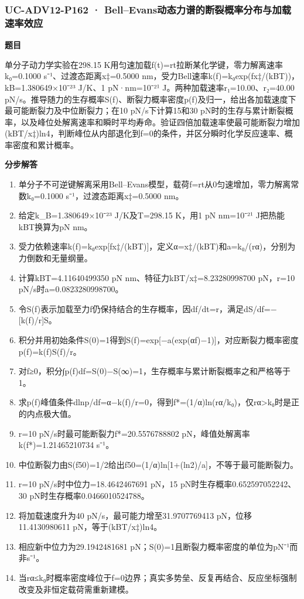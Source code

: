 \documentclass[UTF8,11pt,a4paper]{ctexart}
\begin{document}
\subsubsection*{UC-ADV12-P162 · Bell–Evans动态力谱的断裂概率分布与加载速率效应}
\noindent\textbf{题目}\par
单分子动力学实验在298.15 K用匀速加载f(t)=rt拉断某化学键，零力解离速率k₀=0.1000 s⁻¹、过渡态距离x‡=0.5000 nm，受力Bell速率k(f)=k₀exp(fx‡/(kBT))，kB=1.380649×10⁻²³ J/K、1 pN·nm=10⁻²¹ J。两种加载速率r₁=10.00、r₂=40.00 pN/s。推导随力的生存概率S(f)、断裂力概率密度p(f)及归一，给出各加载速度下最可能断裂力及中位断裂力；在10 pN/s下计算15和30 pN时的生存与累计断裂概率，以及峰位处解离速率和瞬时平均寿命。验证四倍加载速率使最可能断裂力增加(kBT/x‡)ln4，判断峰位从内部退化到f=0的条件，并区分瞬时化学反应速率、概率密度和累计概率。\par
\medskip\noindent\textbf{分步解答}
\begin{enumerate}
\item 单分子不可逆键解离采用Bell–Evans模型，载荷f=rt从0匀速增加，零力解离常数k₀=0.1000 s⁻¹，过渡态距离x‡=0.5000 nm。
\item 给定k\_B=1.380649×10⁻²³ J/K及T=298.15 K，用1 pN nm=10⁻²¹ J把热能kBT换算为pN nm。
\item 受力依赖速率k(f)=k₀exp[fx‡/(kBT)]，定义α=x‡/(kBT)和a=k₀/(rα)，分别为力倒数和无量纲量。
\item 计算kBT=4.11640499350 pN nm、特征力kBT/x‡=8.23280998700 pN，r=10 pN/s时a=0.0823280998700。
\item 令S(f)表示加载至力f仍保持结合的生存概率，因df/dt=r，满足dS/df=−[k(f)/r]S。
\item 积分并用初始条件S(0)=1得到S(f)=exp[−a(exp(αf)−1)]，对应断裂力概率密度p(f)=k(f)S(f)/r。
\item 对f≥0，积分∫p(f)df=S(0)−S(∞)=1，生存概率与累计断裂概率之和严格等于1。
\item 求p(f)峰值条件dlnp/df=α−k(f)/r=0，得到f*=(1/α)ln(rα/k₀)，仅rα>k₀时是正的内点极大值。
\item r=10 pN/s时最可能断裂力f*=20.5576788802 pN，峰值处解离率k(f*)=1.21465210734 s⁻¹。
\item 中位断裂力由S(f50)=1/2给出f50=(1/α)ln[1+(ln2)/a]，不等于最可能断裂力。
\item r=10 pN/s时中位力=18.4642467691 pN，15 pN时生存概率0.652597052242、30 pN时生存概率0.0466010524788。
\item 将加载速度升为40 pN/s，最可能力增至31.9707769413 pN，位移11.4130980611 pN，等于(kBT/x‡)ln4。
\item 相应新中位力为29.1942481681 pN；S(0)=1且断裂力概率密度的单位为pN⁻¹而非s⁻¹。
\item 当rα≤k₀时概率密度峰位于f=0边界；真实多势垒、反复再结合、反应坐标强制改变及非恒定载荷需重新建模。
\end{enumerate}
\end{document}
